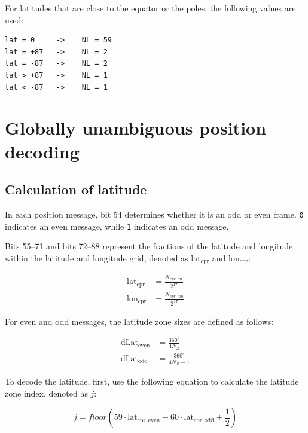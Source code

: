 For latitudes that are close to the equator or the poles, the following values are used:

\begin{verbatim}
lat = 0     ->    NL = 59
lat = +87   ->    NL = 2
lat = -87   ->    NL = 2
lat > +87   ->    NL = 1
lat < -87   ->    NL = 1
\end{verbatim}


\section{Globally unambiguous position decoding} 

\subsection{Calculation of latitude} \label{sec:cpr_airborne_global_lat}

In each position message, bit 54 determines whether it is an odd or even frame. \texttt{0} indicates an even message, while \texttt{1} indicates an odd message.

Bits 55--71 and bits 72--88 represent the fractions of the latitude and longitude within the latitude and longitude grid, denoted as $\mathrm{lat}_\mathrm{cpr}$ and $\mathrm{lon}_\mathrm{cpr}$:

\begin{equation}
  \begin{split}
      \mathrm{lat}_\mathrm{cpr} &= \frac{N_{cpr,lat}}{2^{17}} \\
    \mathrm{lon}_\mathrm{cpr} &= \frac{N_{cpr,lon}}{2^{17}}
  \end{split}
\end{equation}


For even and odd messages, the latitude zone sizes are defined as follows:

\begin{equation}
\begin{split}
  \mathrm{dLat}_\mathrm{even} &= \frac{360^\circ}{4 N_Z} \\
  \mathrm{dLat}_\mathrm{odd} &= \frac{360^\circ}{4 N_Z - 1}
\end{split}
\end{equation}


To decode the latitude, first, use the following equation to calculate the latitude zone index, denoted as $j$:

\begin{equation}
  j = floor \left( 59 \cdot \mathrm{lat}_\mathrm{cpr, even} - 60 \cdot \mathrm{lat}_\mathrm{cpr,odd} + \frac{1}{2}  \right)
\end{equation}


